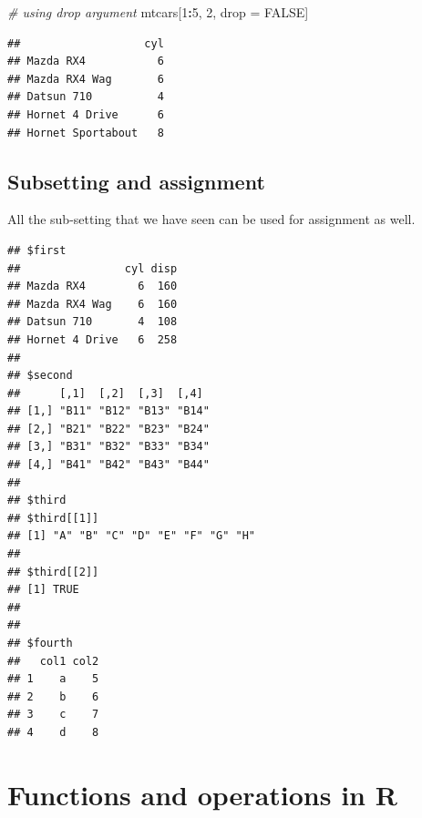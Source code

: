 \documentclass[
]{book}
\newenvironment{Shaded}{\begin{snugshade}}{\end{snugshade}}
\newcommand{\CommentTok}[1]{\textcolor[rgb]{0.56,0.35,0.01}{\textit{#1}}}
\newcommand{\ConstantTok}[1]{\textcolor[rgb]{0.56,0.35,0.01}{#1}}
\newcommand{\DecValTok}[1]{\textcolor[rgb]{0.00,0.00,0.81}{#1}}
\newcommand{\NormalTok}[1]{#1}
\newcommand{\OtherTok}[1]{\textcolor[rgb]{0.56,0.35,0.01}{#1}}
\newcommand{\SpecialCharTok}[1]{\textcolor[rgb]{0.81,0.36,0.00}{\textbf{#1}}}
\begin{document}
\begin{Shaded}
\begin{Highlighting}[]
\CommentTok{\# using drop argument}
\NormalTok{mtcars[}\DecValTok{1}\SpecialCharTok{:}\DecValTok{5}\NormalTok{, }\DecValTok{2}\NormalTok{, drop }\OtherTok{=} \ConstantTok{FALSE}\NormalTok{]}
\end{Highlighting}
\end{Shaded}

\begin{verbatim}
##                   cyl
## Mazda RX4           6
## Mazda RX4 Wag       6
## Datsun 710          4
## Hornet 4 Drive      6
## Hornet Sportabout   8
\end{verbatim}

\hypertarget{subsetting-and-assignment}{%
\section{Subsetting and assignment}\label{subsetting-and-assignment}}

All the sub-setting that we have seen can be used for assignment as well.

\begin{Shaded}
\end{Shaded}

\begin{verbatim}
## $first
##                cyl disp
## Mazda RX4        6  160
## Mazda RX4 Wag    6  160
## Datsun 710       4  108
## Hornet 4 Drive   6  258
## 
## $second
##      [,1]  [,2]  [,3]  [,4] 
## [1,] "B11" "B12" "B13" "B14"
## [2,] "B21" "B22" "B23" "B24"
## [3,] "B31" "B32" "B33" "B34"
## [4,] "B41" "B42" "B43" "B44"
## 
## $third
## $third[[1]]
## [1] "A" "B" "C" "D" "E" "F" "G" "H"
## 
## $third[[2]]
## [1] TRUE
## 
## 
## $fourth
##   col1 col2
## 1    a    5
## 2    b    6
## 3    c    7
## 4    d    8
\end{verbatim}

\hypertarget{func}{%
\chapter{Functions and operations in R}\label{func}}
\end{document}
